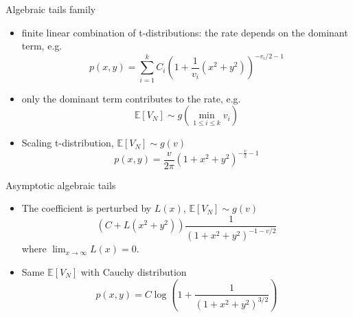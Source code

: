 \documentclass{beamer}
\def\E{\mathbb{E}}
\begin{document}
\begin{frame}{Algebraic tails family}
    \begin{itemize}
        \item finite linear combination of t-distributions: the rate depends on the dominant term, e.g.
        \begin{equation*}
            p(x,y) = \sum_{i=1}^k C_i (1+\frac{1}{v_i}(x^2+y^2))^{-v_i/2 - 1}
        \end{equation*}
        \item only the dominant term contributes to the rate, e.g.
        \begin{equation*}
            \E[V_N] \sim g\left(
                \min_{1\leq i\leq k} v_i
                \right)
        \end{equation*}
        \item Scaling t-distribution, $\E[V_N] \sim g(v)$
        \begin{equation}
            p(x,y)= \frac{v}{2\pi}(1+x^2+y^2)^{-\frac{v}{2}-1}
        \end{equation}
    \end{itemize}
\end{frame}
\begin{frame}{Asymptotic algebraic tails}
    \begin{itemize}
        \item The coefficient is perturbed by $L(x)$, $\E[V_N] \sim g(v)$
        $$
        \left(C+L(x^2+y^2) \right)
        \frac{1}{(1+x^2+y^2)^{-1-v/2}}
        $$
        where $\lim_{x\to \infty} L(x) = 0$.
        \item  Same $\E[V_N]$ with Cauchy distribution
        \begin{equation*}
            p(x,y) = C \log \left(1+\frac{1}{(1+x^2+y^2)^{3/2}} \right)
        \end{equation*}
    \end{itemize}
\end{frame}
\end{document}
